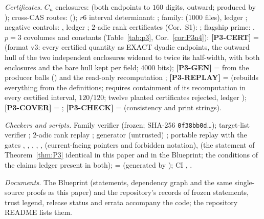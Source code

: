 \documentclass[11pt]{amsart}
\theoremstyle{remark}\newtheorem{remark}[theorem]{Remark}
\theoremstyle{definition}\newtheorem{definition}[theorem]{Definition}
\providecommand{\proofsdir}{../../proofs} %
\begin{document}
\emph{Certificates.} $C_n$ enclosures:  (both endpoints to $160$ digits, outward; produced by ); cross-CAS routes:  (); $r6$ interval determinant: ; family:  ($1000$ files), ledger ; negative controls: , ledger ; $2$-adic rank certificates (Cor.~S1): ; flagship prime: . $p=3$ covolumes and constants (Table~\ref{tab:p3}, Cor.~\ref{cor:P3n4}): \textbf{[P3-CERT]} =  (format v3: every certified quantity as EXACT dyadic endpoints, the outward hull of the two independent enclosures widened to twice its half-width, with both enclosures and the bare hull kept per field; $4000$ bits); \textbf{[P3-GEN]} =  from the producer balls  () and the read-only recomputation ; \textbf{[P3-REPLAY]} =  (rebuilds everything from the definitions; requires containment of its recomputation in every certified interval, $120/120$; twelve planted certificates rejected, ledger ); \textbf{[P3-COVER]} = ; \textbf{[P3-CHECK]} =  (consistency and print strings).

\emph{Checkers and scripts.} Family verifier  (frozen; SHA-256 \texttt{0f38bb0d}\ldots); target-list verifier ; $2$-adic rank replay ; generator (untrusted) ; portable replay  with the gates , , , , ,  (current-facing pointers and forbidden notation),  (the statement of Theorem~\ref{thm:P3} identical in this paper and in the Blueprint; the conditions of the claims ledger present in both); \artNovelty{} =  (generated by ); CI , .

\emph{Documents.} The Blueprint (statements, dependency graph and the same single-source proofs as this paper) and the repository's records of frozen statements, trust legend, release status and errata accompany the code; the repository README lists them.


\end{document}
